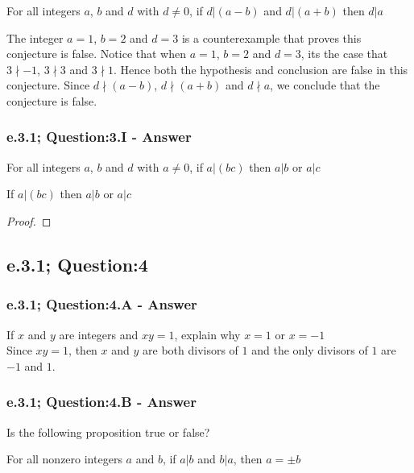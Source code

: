 \begin{tcolorbox}
	\begin{conjecture}
		For all integers $a$, $b$ and $d$ with $d \neq 0$, if $d| (a-b)$ and $d| (a+b)$ then $d|a$
	\end{conjecture}
\end{tcolorbox}

The integer $a=1$, $b=2$ and $d=3$ is a counterexample that proves this conjecture is false. Notice that when $a=1$, $b=2$ and $d=3$, its the case that $3 \nmid -1$, $3 \nmid 3$ and $3 \nmid 1$. Hence both the hypothesis and conclusion are false in this conjecture. Since $d \nmid (a-b)$, $d \nmid (a+b)$ and $d \nmid a$, we conclude that the conjecture is false.  


\subsubsection*{e.3.1; Question:3.I - Answer}
For all integers $a$, $b$ and $d$ with $a \neq 0$, if $a| (bc)$ then $a|b$ or $a|c$

\begin{tcolorbox}
	\begin{theorem}
		If $a| (bc)$ then $a|b$ or $a|c$
	\end{theorem}
\end{tcolorbox}

\begin{proof}

\end{proof}


\newpage
\subsection{e.3.1; Question:4}
\subsubsection*{e.3.1; Question:4.A - Answer}
If $x$ and $y$ are integers and $xy=1$, explain why $x=1$ or $x=-1$ \\

Since $xy = 1$, then $x$ and $y$ are both divisors of $1$ and the only divisors of $1$ are $-1$ and $1$. 


\subsubsection*{e.3.1; Question:4.B - Answer}
Is the following proposition true or false? 
	\begin{center}
		For all nonzero integers $a$ and $b$, if $a|b$ and $b|a$, then $a = \pm b$
	\end{center}

